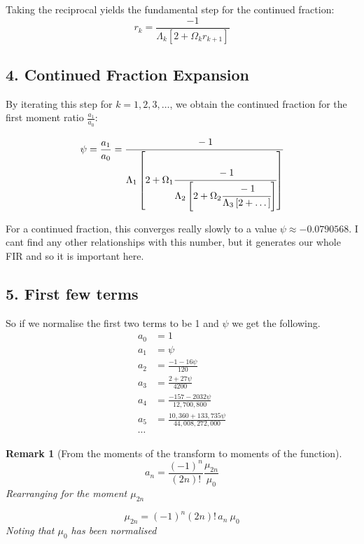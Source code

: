 \documentclass[11pt]{article}
\theoremstyle{breakdef}
\newtheorem{remark}[theorem]{Remark}
\begin{document}
Taking the reciprocal yields the fundamental step for the continued fraction:
\begin{equation}
    r_k = \frac{-1}{\Lambda_k \left[ 2 + \Omega_k r_{k+1} \right]}
\end{equation}

\subsection*{4. Continued Fraction Expansion}
By iterating this step for $k=1, 2, 3, \dots$, we obtain the continued fraction for the first moment ratio $\frac{a_1}{a_0}$:

\begin{equation}
   \psi = \frac{a_1}{a_0} = \cfrac{-1}{\Lambda_1 \left[ 2 + \Omega_1 \cfrac{-1}{\Lambda_2 \left[ 2 + \Omega_2 \cfrac{-1}{\Lambda_3 \left[ 2 + \dots \right]} \right]} \right]}
\end{equation}
\newline


For a continued fraction, this converges really slowly to a value 
$\psi \approx -0.0790568$.  I cant find any other relationships with this number, 
but it generates our whole FIR and so it is important here.

\subsection*{5. First few terms}
So if we normalise the first two terms to be 1 and $\psi$ we get the following.
\begin{equation}
\begin{aligned}
a_0 &= 1 \\
a_1 &= \psi \\
a_2 &= \frac{-1 - 16\psi}{120} \\
a_3 &= \frac{2 + 27\psi}{4200} \\
a_4 &= \frac{-157 - 2032\psi}{12,700,800} \\
a_5 &= \frac{10,360 + 133,735\psi}{44,008,272,000}  \\
\cdots
\end{aligned}
\end{equation}

\begin{remark}[From the moments of the transform to moments of the function]
\begin{equation}
    a_n = \frac{(-1)^n}{(2n)!} \frac{\mu_{2n}}{\mu_{0}}
\end{equation}
Rearranging for the moment $\mu_{2n}$ 

\begin{equation}
    \mu_{2n} = (-1)^n (2n)! \, a_n \ \mu_{0}
\end{equation}
Noting that $\mu_{0}$ has been normalised
\end{remark}
\end{document}
